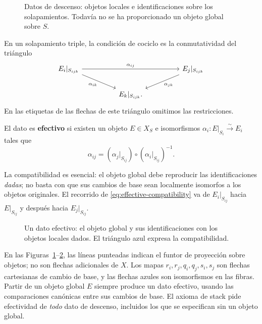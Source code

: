 \documentclass[12pt,openany]{memoir}
\begin{document}
\begin{figure}[htbp]
\centering
\TalkDDDiagram
\caption{Datos de descenso: objetos locales e identificaciones sobre los
solapamientos. Todavía no se ha proporcionado un objeto global sobre \(S\).}
\label{fig:descent-data}
\end{figure}

En un solapamiento triple, la condición de cociclo es la conmutatividad
del triángulo
\[
\begin{tikzcd}[column sep=huge]
 E_i|_{S_{ijk}} \arrow[rr,"\alpha_{ij}"]
   \arrow[dr,"\alpha_{ik}"'] && E_j|_{S_{ijk}} \arrow[dl,"\alpha_{jk}"] \\
 & E_k|_{S_{ijk}} .
\end{tikzcd}
\]
En las etiquetas de las flechas de este triángulo omitimos las restricciones.

\begin{Def}
El dato es \textbf{efectivo} si existen un objeto \(E\in X_S\) e
isomorfismos \(\alpha_i:E|_{S_i}\xrightarrow{\sim}E_i\) tales que
\begin{equation}\label{eq:effective-compatibility}
 \alpha_{ij}
   =(\alpha_j|_{S_{ij}})\circ(\alpha_i|_{S_{ij}})^{-1}.
\end{equation}
\end{Def}

La compatibilidad es esencial: el objeto global debe reproducir las
identificaciones \emph{dadas}; no basta con que sus cambios de base sean
localmente isomorfos a los objetos originales. El recorrido de
\eqref{eq:effective-compatibility} va de \(E_i|_{S_{ij}}\) hacia
\(E|_{S_{ij}}\) y después hacia \(E_j|_{S_{ij}}\).

\begin{figure}[htbp]
\centering
\TalkDDEDiagram
\caption{Un dato efectivo: el objeto global y sus identificaciones con los
objetos locales dados. El triángulo azul expresa la compatibilidad.}
\label{fig:effective-descent}
\end{figure}

En las Figuras~\ref{fig:descent-data}--\ref{fig:effective-descent}, las
líneas punteadas indican el funtor de proyección sobre objetos; no son
flechas adicionales de \(X\). Los mapas \(r_i,r_j,q_i,q_j,s_i,s_j\)
son flechas cartesianas de cambio de base, y las flechas azules son
isomorfismos en las fibras. Partir de un objeto global \(E\) siempre
produce un dato efectivo, usando las comparaciones canónicas entre sus
cambios de base. El axioma de stack pide efectividad de \emph{todo} dato de
descenso, incluidos los que se especifican sin un objeto global.
\end{document}
